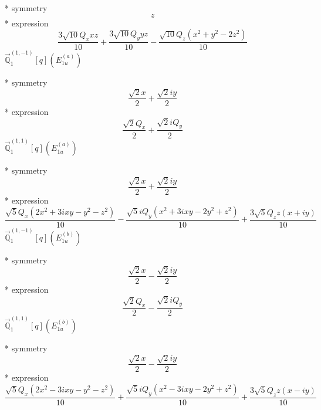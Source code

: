 \documentclass[fleqn,8pt]{jsarticle}
\begin{document}
\noindent\quad ** symmetry
\begin{dmath*}
z
\end{dmath*}
\noindent\quad ** expression
\begin{dmath*}
\frac{3 \sqrt{10} Q_{x} x z}{10} + \frac{3 \sqrt{10} Q_{y} y z}{10} - \frac{\sqrt{10} Q_{z} \left(x^{2} + y^{2} - 2 z^{2}\right)}{10}
\end{dmath*}
\noindent\quad $\vec{\mathbb{Q}}_{1}^{(1,-1)}[q](E_{1u}^{(a)})$

\noindent\quad ** symmetry
\begin{dmath*}
\frac{\sqrt{2} x}{2} + \frac{\sqrt{2} i y}{2}
\end{dmath*}
\noindent\quad ** expression
\begin{dmath*}
\frac{\sqrt{2} Q_{x}}{2} + \frac{\sqrt{2} i Q_{y}}{2}
\end{dmath*}
\noindent\quad $\vec{\mathbb{Q}}_{1}^{(1,1)}[q](E_{1u}^{(a)})$

\noindent\quad ** symmetry
\begin{dmath*}
\frac{\sqrt{2} x}{2} + \frac{\sqrt{2} i y}{2}
\end{dmath*}
\noindent\quad ** expression
\begin{dmath*}
\frac{\sqrt{5} Q_{x} \left(2 x^{2} + 3 i x y - y^{2} - z^{2}\right)}{10} - \frac{\sqrt{5} i Q_{y} \left(x^{2} + 3 i x y - 2 y^{2} + z^{2}\right)}{10} + \frac{3 \sqrt{5} Q_{z} z \left(x + i y\right)}{10}
\end{dmath*}
\noindent\quad $\vec{\mathbb{Q}}_{1}^{(1,-1)}[q](E_{1u}^{(b)})$

\noindent\quad ** symmetry
\begin{dmath*}
\frac{\sqrt{2} x}{2} - \frac{\sqrt{2} i y}{2}
\end{dmath*}
\noindent\quad ** expression
\begin{dmath*}
\frac{\sqrt{2} Q_{x}}{2} - \frac{\sqrt{2} i Q_{y}}{2}
\end{dmath*}
\noindent\quad $\vec{\mathbb{Q}}_{1}^{(1,1)}[q](E_{1u}^{(b)})$

\noindent\quad ** symmetry
\begin{dmath*}
\frac{\sqrt{2} x}{2} - \frac{\sqrt{2} i y}{2}
\end{dmath*}
\noindent\quad ** expression
\begin{dmath*}
\frac{\sqrt{5} Q_{x} \left(2 x^{2} - 3 i x y - y^{2} - z^{2}\right)}{10} + \frac{\sqrt{5} i Q_{y} \left(x^{2} - 3 i x y - 2 y^{2} + z^{2}\right)}{10} + \frac{3 \sqrt{5} Q_{z} z \left(x - i y\right)}{10}
\end{dmath*}
\end{document}
